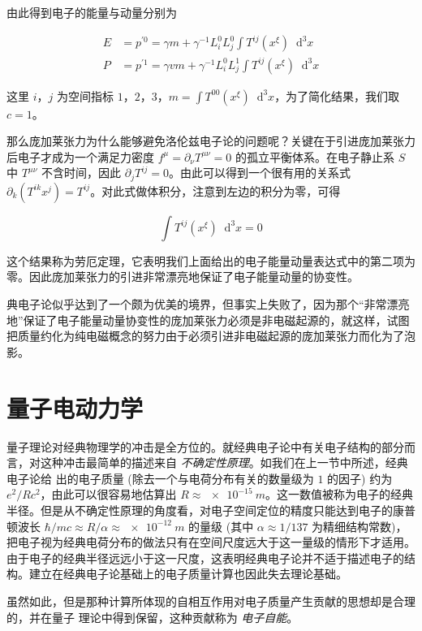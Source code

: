 \documentclass[oneside,a4paper,openany,11pt]{ctexbook}
\newcommand*{\dif}{\mathop{}\!\mathrm{d}} %
\begin{document}
由此得到电子的能量与动量分别为

\begin{align}
    E &= p^{\prime 0} = \gamma m + \gamma^{-1} L_i^0 L_j^0 \int T^{ij} (x^\xi) \dif^3 x \\
    P &= p^{\prime 1} = \gamma v m + \gamma^{-1} L_i^0 L_j^1 \int T^{ij} (x^\xi) \dif^3 x
\end{align}

这里 $i，j$ 为空间指标 $1，2，3$，$m=\int T^{00} (x^\xi) \dif^3 x$，为了简化结果，我们取 $c=1$。

那么庞加莱张力为什么能够避免洛伦兹电子论的问题呢？关键在于引进庞加莱张力后电子才成为一个满足力密度 $f^\mu = \partial_\nu T^{\mu\nu}=0$ 的孤立平衡体系。在电子静止系 $S$ 中 $T^{\mu\nu}$ 不含时间，因此 $\partial_j T^{ij}=0$。由此可以得到一个很有用的关系式 $\partial_k (T^{ik} x^j)=T^{ij}$。对此式做体积分，注意到左边的积分为零，可得

\begin{equation}
    \int T^{ij} (x^\xi) \dif^3 x = 0
\end{equation}

这个结果称为劳厄定理，它表明我们上面给出的电子能量动量表达式中的第二项为零。因此庞加莱张力的引进非常漂亮地保证了电子能量动量的协变性。

典电子论似乎达到了一个颇为优美的境界，但事实上失败了，因为那个“非常漂亮地”保证了电子能量动量协变性的庞加莱张力必须是非电磁起源的，就这样，试图把质量约化为纯电磁概念的努力由于必须引进非电磁起源的庞加莱张力而化为了泡影。

\section{量子电动力学}

量子理论对经典物理学的冲击是全方位的。就经典电子论中有关电子结构的部分而言，对这种冲击最简单的描述来自 \emph{不确定性原理}。如我们在上一节中所述，经典电子论给
出的电子质量 (除去一个与电荷分布有关的数量级为 $1$ 的因子) 约为 $e^2/R c^2$，由此可以很容易地估算出 $R \approx \qty{e-15}{m}$。这一数值被称为电子的经典半径。但是从不确定性原理的角度看，对电子空间定位的精度只能达到电子的康普顿波长 $\hbar/mc \approx R/\alpha \approx \qty{e-12}{m}$ 的量级 (其中 $\alpha\approx 1/137$ 为精细结构常数)，把电子视为经典电荷分布的做法只有在空间尺度远大于这一量级的情形下才适用。由于电子的经典半径远远小于这一尺度，这表明经典电子论并不适于描述电子的结构。建立在经典电子论基础上的电子质量计算也因此失去理论基础。

虽然如此，但是那种计算所体现的自相互作用对电子质量产生贡献的思想却是合理的，并在量子
理论中得到保留，这种贡献称为 \emph{电子自能}。
\end{document}
